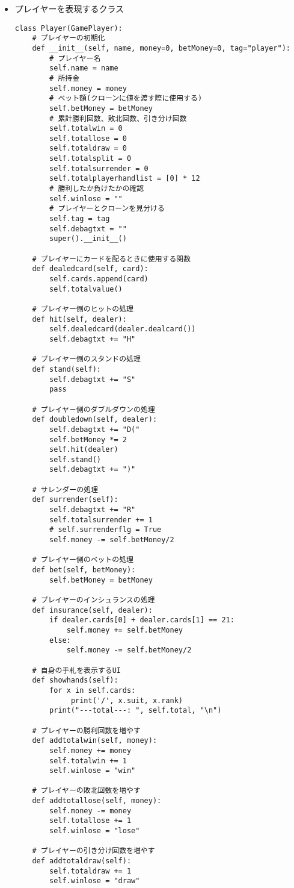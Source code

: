 \begin{itemize}
\item プレイヤーを表現するクラス
\begin{lstlisting}
class Player(GamePlayer):
    # プレイヤーの初期化
    def __init__(self, name, money=0, betMoney=0, tag="player"):
        # プレイヤー名
        self.name = name
        # 所持金
        self.money = money
        # ベット額(クローンに値を渡す際に使用する)
        self.betMoney = betMoney
        # 累計勝利回数、敗北回数、引き分け回数
        self.totalwin = 0
        self.totallose = 0
        self.totaldraw = 0
        self.totalsplit = 0
        self.totalsurrender = 0
        self.totalplayerhandlist = [0] * 12
        # 勝利したか負けたかの確認
        self.winlose = ""
        # プレイヤーとクローンを見分ける
        self.tag = tag
        self.debagtxt = ""
        super().__init__()

    # プレイヤーにカードを配るときに使用する関数
    def dealedcard(self, card):
        self.cards.append(card)
        self.totalvalue()

    # プレイヤー側のヒットの処理
    def hit(self, dealer):
        self.dealedcard(dealer.dealcard())
        self.debagtxt += "H"

    # プレイヤー側のスタンドの処理
    def stand(self):
        self.debagtxt += "S"
        pass

    # プレイヤ－側のダブルダウンの処理
    def doubledown(self, dealer):
        self.debagtxt += "D("
        self.betMoney *= 2
        self.hit(dealer)
        self.stand()
        self.debagtxt += ")"

    # サレンダーの処理
    def surrender(self):
        self.debagtxt += "R"
        self.totalsurrender += 1
        # self.surrenderflg = True
        self.money -= self.betMoney/2

    # プレイヤー側のベットの処理
    def bet(self, betMoney):
        self.betMoney = betMoney

    # プレイヤーのインシュランスの処理
    def insurance(self, dealer):
        if dealer.cards[0] + dealer.cards[1] == 21:
            self.money += self.betMoney
        else:
            self.money -= self.betMoney/2

    # 自身の手札を表示するUI
    def showhands(self):
        for x in self.cards:
             print('/', x.suit, x.rank)
        print("---total---: ", self.total, "\n")

    # プレイヤーの勝利回数を増やす
    def addtotalwin(self, money):
        self.money += money
        self.totalwin += 1
        self.winlose = "win"

    # プレイヤーの敗北回数を増やす
    def addtotallose(self, money):
        self.money -= money
        self.totallose += 1
        self.winlose = "lose"

    # プレイヤーの引き分け回数を増やす
    def addtotaldraw(self):
        self.totaldraw += 1
        self.winlose = "draw"

\end{lstlisting}
\end{itemize}
\newpage